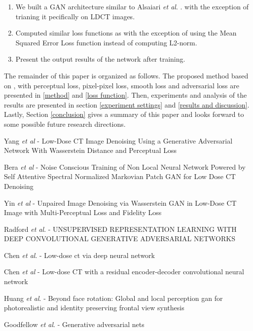 \documentclass[journal]{IEEEtran}
\begin{document}
	\begin{enumerate}
		\item We built a GAN architecture similar to Alsaiari \emph{et al}. \cite{alsaiari2019image}. with the exception of trianing it pecifically on LDCT images.
		\item Computed similar loss functions as \cite{alsaiari2019image} with the exception of using the Mean Squared Error Loss function instead of computing L2-norm.
		\item Present the output results of the network after training.
	\end{enumerate}
	
	The remainder of this paper is organized as follows.  The proposed method based on \cite{alsaiari2019image}, with perceptual loss, pixel-pixel loss, smooth loss and adversarial loss are presented in \ref{method} and \ref{loss function}.  Then, experiments and analysis of the results are presented in section \ref{experiment settings} and \ref{results and discussion}.  Lastly, Section \ref{conclusion} gives a summary of this paper and looks forward to some possible future research directions.

\cite{8340157} Yang \emph{et al} - Low-Dose CT Image Denoising Using a Generative Adversarial Network With Wasserstein Distance and Perceptual Loss

\cite{9474492} Bera \emph{et al} - Noise Conscious Training of Non Local Neural Network Powered by Self Attentive Spectral Normalized Markovian Patch GAN for Low Dose CT Denoising

\cite{yin2021unpaired} Yin \emph{et al} - Unpaired Image Denoising via Wasserstein GAN in Low-Dose CT Image with Multi-Perceptual Loss and Fidelity Loss

\cite{radford2015unsupervised} Radford \emph{et al}. - UNSUPERVISED REPRESENTATION LEARNING WITH DEEP CONVOLUTIONAL GENERATIVE ADVERSARIAL NETWORKS

\cite{chen2017low} Chen \emph{et al}. - Low-dose ct via deep neural network

\cite{chen2017low2} Chen \emph{et al} - Low-dose CT with a residual encoder-decoder convolutional neural network

\cite{huang2017beyond} Huang \emph{et al}. - Beyond face rotation: Global and local perception gan for photorealistic and identity preserving frontal view synthesis

\cite{goodfellow2014generative} Goodfellow \emph{et al}. - Generative adversarial nets
\end{document}
